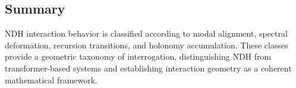\subsection{Summary}

NDH interaction behavior is classified according to modal alignment, spectral
deformation, recursion transitions, and holonomy accumulation. These classes
provide a geometric taxonomy of interrogation, distinguishing NDH from
transformer-based systems and establishing interaction geometry as a coherent
mathematical framework.
